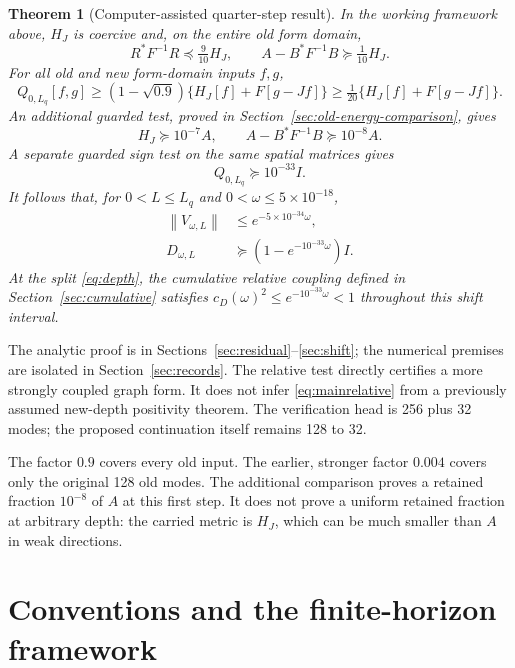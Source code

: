 \documentclass[11pt]{article}
\newtheorem{theorem}{Theorem}[section]
\theoremstyle{remark}\newtheorem{remark}[theorem]{Remark}
\newcommand{\norm}[1]{\left\|#1\right\|}
\begin{document}
\begin{theorem}[Computer-assisted quarter-step result]\label{thm:main}
In the working framework above, $H_J$ is coercive and, on the entire old form domain,
\begin{equation}\label{eq:mainrelative}
 R^*F^{-1}R\preceq\tfrac9{10}H_J,\qquad
 A-B^*F^{-1}B\succeq\tfrac1{10}H_J.
\end{equation}
For all old and new form-domain inputs $f,g$,
\begin{equation}\label{eq:mainenergy}
 Q_{0,L_q}[f,g]\ge(1-\sqrt{0.9})\{H_J[f]+F[g-Jf]\}
 \ge\tfrac1{20}\{H_J[f]+F[g-Jf]\}.
\end{equation}
An additional guarded test, proved in Section~\ref{sec:old-energy-comparison}, gives
\[
 H_J\succeq10^{-7}A,\qquad A-B^*F^{-1}B\succeq10^{-8}A.
\]
A separate guarded sign test on the same spatial matrices gives
\begin{equation}\label{eq:mainfloor}
 Q_{0,L_q}\succeq10^{-33}I.
\end{equation}
It follows that, for $0<L\le L_q$ and $0<\omega\le5\times10^{-18}$,
\begin{align}
 \norm{V_{\omega,L}}&\le e^{-5\times10^{-34}\omega},\label{eq:maincontract}\\
 D_{\omega,L}&\succeq(1-e^{-10^{-33}\omega})I.\label{eq:maindefect}
\end{align}
At the split \eqref{eq:depth}, the cumulative relative coupling defined in Section~\ref{sec:cumulative} satisfies $c_D(\omega)^2\le e^{-10^{-33}\omega}<1$ throughout this shift interval.
\end{theorem}

The analytic proof is in Sections~\ref{sec:residual}--\ref{sec:shift}; the numerical premises are isolated in Section~\ref{sec:records}. The relative test directly certifies a more strongly coupled graph form. It does not infer \eqref{eq:mainrelative} from a previously assumed new-depth positivity theorem. The verification head is 256 plus 32 modes; the proposed continuation itself remains 128 to 32.

The factor $0.9$ covers every old input. The earlier, stronger factor $0.004$ covers only the original 128 old modes. The additional comparison proves a retained fraction $10^{-8}$ of $A$ at this first step. It does not prove a uniform retained fraction at arbitrary depth: the carried metric is $H_J$, which can be much smaller than $A$ in weak directions.

\section{Conventions and the finite-horizon framework}\label{sec:framework}
\end{document}
